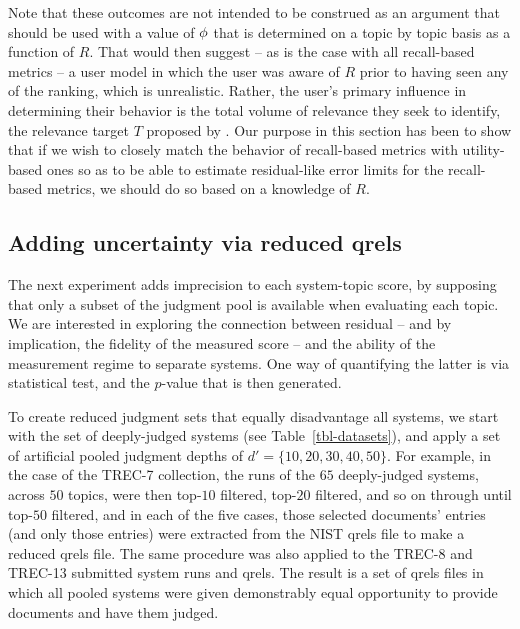 Note that these outcomes are not intended to be construed as an
argument that {\rbp} should be used with a value of $\mbox{$\phi$}$ that is
determined on a topic by topic basis as a function of $R$.
That would then suggest -- as is the case with all recall-based
metrics -- a user model in which the user was aware of $R$ prior to
having seen any of the ranking, which is unrealistic.
Rather, the user's primary influence in determining their behavior is
the total volume of relevance they seek to identify, the relevance
target $T$ proposed by {\citet{mts13cikm,mbst17acmtois}}.
Our purpose in this section has been to show that if we wish to
closely match the behavior of recall-based metrics with utility-based
ones so as to be able to estimate residual-like error limits for the
recall-based metrics, we should do so based on a knowledge of $R$.


\subsection{Adding uncertainty via reduced qrels}

The next experiment adds imprecision to each system-topic score, by
supposing that only a subset of the judgment pool is available when
evaluating each topic.
We are interested in exploring the connection between residual -- and
by implication, the fidelity of the measured score -- and the ability
of the measurement regime to separate systems.
One way of quantifying the latter is via statistical test, and the
$p$-value that is then generated.

To create reduced judgment sets that equally disadvantage all
systems, we start with the set of deeply-judged systems (see
Table~\ref{tbl-datasets}), and apply a set of artificial pooled
judgment depths of $d'=\{10,20,30,40,50\}$.
For example, in the case of the TREC-7 collection, the runs of the
$65$ deeply-judged systems, across $50$ topics, were then top-$10$
filtered, top-$20$ filtered, and so on through until top-$50$
filtered, and in each of the five cases, those selected documents'
entries (and only those entries) were extracted from the NIST qrels
file to make a reduced qrels file.
The same procedure was also applied to the TREC-8 and TREC-13
submitted system runs and qrels.
The result is a set of qrels files in which all pooled systems were
given demonstrably equal opportunity to provide documents and have
them judged.

\begin{table}[t]
\centering

\aftertabspace
\end{table}

